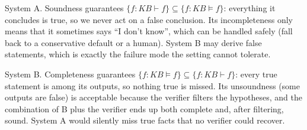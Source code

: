 \begin{solution}
System A. Soundness guarantees $\{f:KB\vdash f\}\subseteq\{f:KB\vDash f\}$: everything it concludes is true, so
we never act on a false conclusion. Its incompleteness only means that it sometimes says ``I don't know'', which can be
handled safely (fall back to a conservative default or a human). System B may derive false statements, which is
exactly the failure mode the setting cannot tolerate.
\end{solution}

\begin{solution}
System B. Completeness guarantees $\{f:KB\vDash f\}\subseteq\{f:KB\vdash f\}$: every true statement is among its
outputs, so nothing true is missed. Its unsoundness (some outputs are false) is acceptable because the verifier
filters the hypotheses, and the combination of B plus the verifier ends up both complete and, after filtering,
sound. System A would silently miss true facts that no verifier could recover.
\end{solution}
